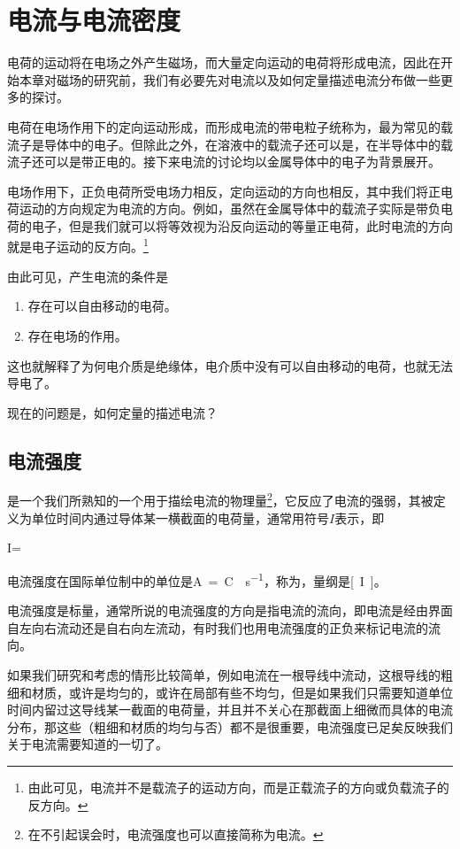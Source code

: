 \section{电流与电流密度}
电荷的运动将在电场之外产生磁场，而大量定向运动的电荷将形成电流，因此在开始本章对磁场的研究前，我们有必要先对电流以及如何定量描述电流分布做一些更多的探讨。

电荷在电场作用下的定向运动形成，而形成电流的带电粒子统称为，最为常见的载流子是导体中的电子。但除此之外，在溶液中的载流子还可以是，在半导体中的载流子还可以是带正电的。接下来电流的讨论均以金属导体中的电子为背景展开。

电场作用下，正负电荷所受电场力相反，定向运动的方向也相反，其中我们将正电荷运动的方向规定为电流的方向。例如，虽然在金属导体中的载流子实际是带负电荷的电子，但是我们就可以将等效视为沿反向运动的等量正电荷，此时电流的方向就是电子运动的反方向。\footnote{由此可见，电流并不是载流子的运动方向，而是正载流子的方向或负载流子的反方向。}

由此可见，产生电流的条件是
\begin{enumerate}
    \item 存在可以自由移动的电荷。
    \item 存在电场的作用。
\end{enumerate}
这也就解释了为何电介质是绝缘体，电介质中没有可以自由移动的电荷，也就无法导电了。

现在的问题是，如何定量的描述电流？

\subsection{电流强度}
是一个我们所熟知的一个用于描绘电流的物理量\footnote{在不引起误会时，电流强度也可以直接简称为电流。}，它反应了电流的强弱，其被定义为单位时间内通过导体某一横截面的电荷量，通常用符号$I$表示，即
\begin{BoxDefinition}[电流强度]
    I=
\end{BoxDefinition}
电流强度在国际单位制中的单位是\si{A=C\cdot s^{-1}}，称为，量纲是\si{[I]}。

电流强度是标量，通常所说的电流强度的方向是指电流的流向，即电流是经由界面自左向右流动还是自右向左流动，有时我们也用电流强度的正负来标记电流的流向。

如果我们研究和考虑的情形比较简单，例如电流在一根导线中流动，这根导线的粗细和材质，或许是均匀的，或许在局部有些不均匀，但是如果我们只需要知道单位时间内留过这导线某一截面的电荷量，并且并不关心在那截面上细微而具体的电流分布，那这些（粗细和材质的均匀与否）都不是很重要，电流强度已足矣反映我们关于电流需要知道的一切了。

